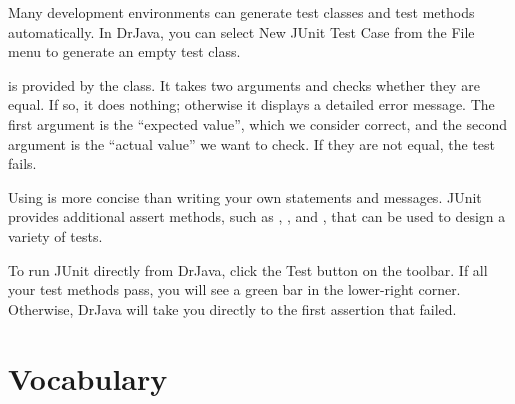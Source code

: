 Many development environments can generate test classes and test methods automatically.
In DrJava, you can select {\sf New JUnit Test Case} from the {\sf File} menu to generate an empty test class.

 is provided by the  class.
It takes two arguments and checks whether they are equal.
If so, it does nothing; otherwise it displays a detailed error message.
The first argument is the ``expected value'', which we consider correct, and the second argument is the ``actual value'' we want to check.
If they are not equal, the test fails.


Using  is more concise than writing your own  statements and  messages.
JUnit provides additional assert methods, such as , , and , that can be used to design a variety of tests.

To run JUnit directly from DrJava, click the {\sf Test} button on the toolbar.
If all your test methods pass, you will see a green bar in the lower-right corner.
Otherwise, DrJava will take you directly to the first assertion that failed.


\section{Vocabulary}

